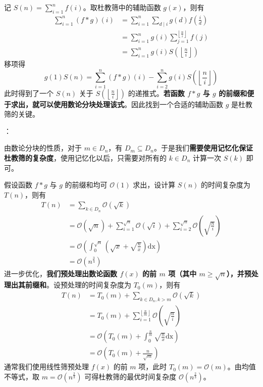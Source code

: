 记 $S(n) = \sum_{i = 1}^n f(i)$。取杜教筛中的辅助函数 $g(x)$，则有
\[
\begin{aligned}
\sum_{i = 1}^n (f \ast g)(i) & = \sum_{i = 1}^n \sum_{d \mid i} g(d)f\left( \frac{i}{d} \right) \\
& = \sum_{i = 1}^n g(i) \sum_{j = 1}^{\left\lfloor \frac{n}{i} \right\rfloor} f(j) \\
& = \sum_{i = 1}^n g(i) S\left( \left\lfloor \frac{n}{i} \right\rfloor \right)
\end{aligned}
\]
移项得
\[
g(1)S(n) = \sum_{i = 1}^n (f \ast g)(i) - \sum_{i = 2}^n g(i)S\left( \left\lfloor \frac{n}{i} \right\rfloor \right)
\]
此时得到了一个 $S(n)$ 关于 $S\left( \left\lfloor \frac{n}{i} \right\rfloor \right)$ 的递推式。\textbf{若函数 $f \ast g$ 与 $g$ 的前缀和便于求出，就可以使用数论分块处理该式}。因此找到一个合适的辅助函数 $g$ 是杜教筛的关键。

：

由数论分块的性质，对于 $m \in D_n$，有 $D_m \subseteq D_n$。于是我们\textbf{需要使用记忆化保证杜教筛的复杂度}，使用记忆化以后，只需要对所有的 $k \in D_n$ 计算一次 $S(k)$ 即可。

假设函数 $f \ast g$ 与 $g$ 的前缀和均可 $\mathcal{O}(1)$ 求出，设计算 $S(n)$ 的时间复杂度为 $T(n)$，则有
\[
\begin{aligned}
T(n) & = \sum\limits_{k \in D_n} \mathcal{O}(\sqrt{k}) \\
& = \mathcal{O}(\sqrt{n}) + \sum_{i = 1}^{\sqrt{n}}\mathcal{O}(\sqrt{i}) + \sum_{i = 2}^{\sqrt{n}} \mathcal{O}\left( \sqrt{\frac{n}{i}} \right) \\
& = \mathcal{O}\left( \int_0^{\sqrt{n}} \left( \sqrt{x} + \sqrt{\frac{n}{x}} \right) \mathrm{dx} \right) \\
& = \mathcal{O}(n^{\frac{3}{4}})
\end{aligned}
\]
进一步优化，\textbf{我们预处理出数论函数 $f(x)$ 的前 $m$ 项（其中 $m \geq \sqrt{n}$），并预处理出其前缀和}。设预处理的时间复杂度为 $T_0(m)$，则有
\[
\begin{aligned}
T(n) & = T_0(m) + \sum_{k \in D_n, k > m} \mathcal{O}(\sqrt{k}) \\
& = T_0(m) + \sum_{i = 1}^{\left\lfloor \frac{n}{m} \right\rfloor} \mathcal{O}\left(\sqrt{\frac{n}{i}}\right) \\
& = \mathcal{O}\left(T_0(m) + \int_0^{\frac{n}{m}} \sqrt{\frac{n}{x}} \mathrm{dx}\right) \\
& = \mathcal{O}\left(T_0(m) + \frac{n}{\sqrt{m}} \right)
\end{aligned}
\]
通常我们使用线性筛预处理 $f(x)$ 的前 $m$ 项，此时 $T_0(m) = \mathcal{O}(m)$。由均值不等式，取 $m = \mathcal{O}(n^{\frac{2}{3}})$ 可得杜教筛的最优时间复杂度 $\mathcal{O}(n^{\frac{2}{3}})$。

